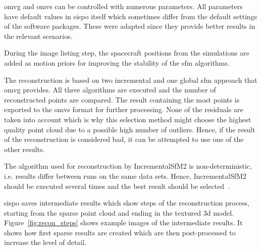 \gls{omvg} and \gls{omvs} can be controlled with numerous parameters. All parameters have default values in \gls{sispo} itself which sometimes differ from the default settings of the software packages. These were adapted since they provide better results in the relevant scenarios.

During the image listing step, the spacecraft positions from the simulations are added as motion priors for improving the stability of the \gls{sfm} algorithms.

The reconstruction is based on two incremental and one global \gls{sfm} approach that \gls{omvg} provides. All three algorithms are executed and the number of reconstructed points are compared. The result containing the most points is exported to the \gls{omvs} format for further processing. None of the residuals are taken into account which is why this selection method might choose the highest quality point cloud due to a possible high number of outliers. Hence, if the result of the reconstruction is considered bad, it can be attempted to use one of the other results.

The algorithm used for reconstruction by IncrementalSfM2 is non-deterministic, i.e. results differ between runs on the same data sets. Hence, IncrementalSfM2 should be executed several times and the best result should be selected~\cite{Pajusalu2019CharacterizationMapping}.


\Gls{sispo} saves intermediate results which show steps of the reconstruction process, starting from the sparse point cloud and ending in the textured \gls{3d} model. Figure~\ref{fig:recon_steps} shows example images of the intermediate results. It shows how first sparse results are created which are then post-processed to increase the level of detail.

